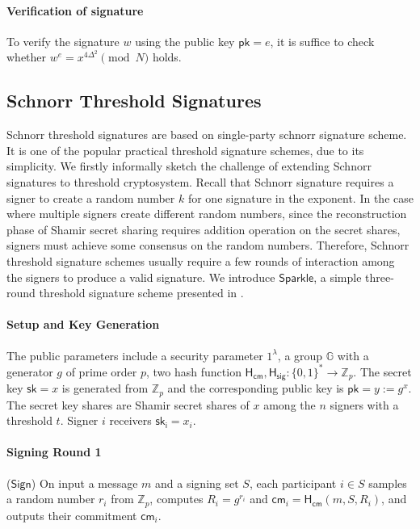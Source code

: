 \paragraph{Verification of signature} To verify the signature $w$ using the public key $\mathsf{pk}=e$, it is suffice to check whether $w^e=x^{4\Delta^2}\pmod{N}$ holds. 


\subsection{Schnorr Threshold Signatures}
Schnorr threshold signatures are based on single-party schnorr signature scheme. It is one of the popular practical threshold signature schemes, due to its simplicity. We firstly informally sketch the challenge of extending Schnorr signatures to threshold cryptosystem. Recall that Schnorr signature requires a signer to create a random number $k$ for one signature in the exponent. In the case where multiple signers create different random numbers, since the reconstruction phase of Shamir secret sharing requires addition operation on the secret shares, signers must achieve some consensus on the random numbers. Therefore, Schnorr threshold signature schemes usually require a few rounds of interaction among the signers to produce a valid signature. We introduce $\mathsf{Sparkle}$, a simple three-round threshold signature scheme presented in \cite{DBLP:conf/crypto/CritesKM23}.

\paragraph{Setup and Key Generation} The public parameters include a security parameter $1^\lambda$, a group $\mathbb{G}$ with a generator $g$ of prime order $p$, two hash function $\mathsf{H_{cm}}, \mathsf{H_{sig}}: \{0,1\}^\ast \to \mathbb{Z}_p$. The secret key $\mathsf{sk}=x$ is generated from $\mathbb{Z}_p$ and the corresponding public key is $\mathsf{pk}=y:=g^x$. The secret key shares are Shamir secret shares of $x$ among the $n$ signers with a threshold $t$. Signer $i$ receivers $\mathsf{sk_i}=x_i$. 

\paragraph{Signing Round 1} ($\mathsf{Sign}$) On input a message $m$ and a signing set $S$, each participant $i\in S$ samples a random number $r_i$ from $\mathbb{Z}_p$, computes $R_i=g^{r_i}$ and $\mathsf{cm}_i=\mathsf{H_{cm}}(m, S, R_i)$, and outputs their commitment $\mathsf{cm}_i$. 

